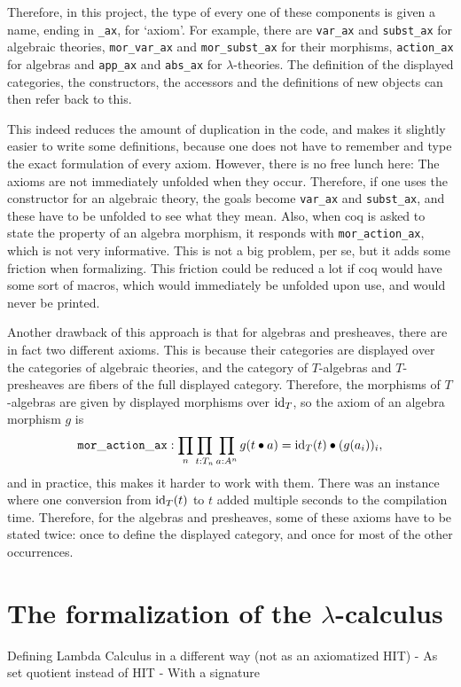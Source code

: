 Therefore, in this project, the type of every one of these components is given a name, ending in \texttt{\_ax}, for `axiom'. For example, there are \texttt{var\_ax} and \texttt{subst\_ax} for algebraic theories, \texttt{mor\_var\_ax} and \texttt{mor\_subst\_ax} for their morphisms, \texttt{action\_ax} for algebras and \texttt{app\_ax} and \texttt{abs\_ax} for $ \lambda $-theories. The definition of the displayed categories, the constructors, the accessors and the definitions of new objects can then refer back to this.

This indeed reduces the amount of duplication in the code, and makes it slightly easier to write some definitions, because one does not have to remember and type the exact formulation of every axiom. However, there is no free lunch here: The axioms are not immediately unfolded when they occur. Therefore, if one uses the constructor for an algebraic theory, the goals become \texttt{var\_ax} and \texttt{subst\_ax}, and these have to be unfolded to see what they mean. Also, when coq is asked to state the property of an algebra morphism, it responds with \texttt{mor\_action\_ax}, which is not very informative. This is not a big problem, per se, but it adds some friction when formalizing. This friction could be reduced a lot if coq would have some sort of macros, which would immediately be unfolded upon use, and would never be printed.

Another drawback of this approach is that for algebras and presheaves, there are in fact two different axioms. This is because their categories are displayed over the categories of algebraic theories, and the category of $ T $-algebras and $ T $-presheaves are fibers of the full displayed category. Therefore, the morphisms of $ T $-algebras are given by displayed morphisms over $ \text{id}_{T} $, so the axiom of an algebra morphism $ g $ is
\[ \mathtt{mor\_action\_ax}: \prod_n \prod_{t : T_n} \prod_{a : A^n} g (t \bullet a) = \text{id}_{T}(t) \bullet (g (a_i))_i, \]
and in practice, this makes it harder to work with them. There was an instance where one conversion from $ \text{id}_{T}(t) $ to $ t $ added multiple seconds to the compilation time. Therefore, for the algebras and presheaves, some of these axioms have to be stated twice: once to define the displayed category, and once for most of the other occurrences.

\section{The formalization of the \texorpdfstring{$ \lambda $}{lambda}-calculus} \label{sec:axiomatic-lambda-calculus}
Defining Lambda Calculus in a different way (not as an axiomatized HIT)
  - As set quotient instead of HIT
  - With a signature

